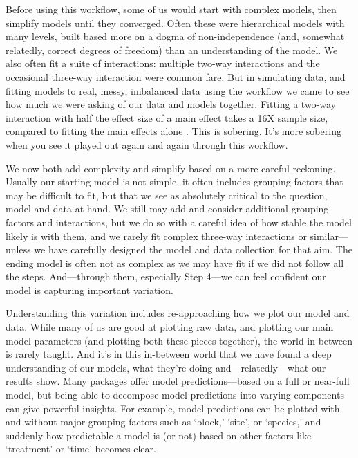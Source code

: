 \documentclass[11pt]{article}
\begin{document}
{%
Before using this workflow, some of us would start with complex models, then simplify models until they converged. Often these were hierarchical models with many levels, built based more on a dogma of non-independence (and, somewhat relatedly, correct degrees of freedom) than an understanding of the model. We also often fit a suite of interactions: multiple two-way interactions and the occasional three-way interaction were common fare. But in simulating data, and fitting models to real, messy, imbalanced data using the workflow we came to see how much we were asking of our data and models together. Fitting a two-way interaction with half the effect size of a main effect takes a 16X sample size, compared to fitting the main effects alone \citep[the main effects then average over the interactions, see][for more details]{regotherstories}. This is sobering. It's more sobering when you see it played out again and again through this workflow. 

We now both add complexity and simplify based on a more careful reckoning. Usually our starting model is not simple, it often includes grouping factors that may be difficult to fit, but that we see as absolutely critical to the question, model and data at hand. We still may add and consider additional grouping factors and interactions, but we do so with a careful idea of how stable the model likely is with them, and we rarely fit complex three-way interactions or similar---unless we have carefully designed the model and data collection for that aim. The ending model is often not as complex as we may have fit if we did not follow all the steps. And---through them, especially Step 4---we can feel confident our model is capturing important variation. 

Understanding this variation includes re-approaching how we plot our model and data. While many of us are good at plotting raw data, and plotting our main model parameters (and plotting both these pieces together), the world in between is rarely taught. And it's in this in-between world that we have found a deep understanding of our models, what they're doing and---relatedly---what our results show. Many packages offer model predictions---based on a full or near-full model, but being able to decompose model predictions into varying components can give powerful insights. For example, model predictions can be plotted with and without major grouping factors such as `block,' `site', or `species,' and suddenly how predictable a model is (or not) based on other factors like `treatment' or `time' becomes clear. 

}
\end{document}
